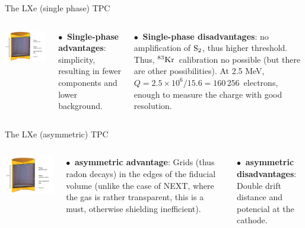\documentclass [aspectratio=169]{beamer}
\newcommand{\KR}{\ensuremath{{}^{83}{\rm Kr}}}
\newcommand{\st}{\ensuremath{\rm S_2}}
\begin{document}
\begin{frame}{The LXe (single phase) TPC}
\begin{columns}
\includegraphics[scale=0.6]{nexosketch.png}

$\bullet~$ {\bf Single-phase advantages}: simplicity, resulting in fewer components and lower background. 

$\bullet~$ {\bf Single-phase disadvantages}: no amplification of \st, thus higher threshold. Thus, \KR\ calibration no possible (but there are other possibilities). At 2.5 MeV, $Q = 2.5\times 10^6/15.6 = 160\, 256$~electrons, enough to measure the charge with good resolution.  
\end{columns}
\end{frame}

\begin{frame}{The LXe (asymmetric) TPC}
\begin{columns}
\includegraphics[scale=0.6]{nexosketch.png}

$\bullet~$ {\bf asymmetric advantage}: Grids (thus radon decays) in the edges of the fiducial volume (unlike the case of NEXT, where the gas is rather transparent, this is a must, otherwise shielding inefficient). 

$\bullet~$ {\bf asymmetric disadvantages}: Double drift distance and potencial at the cathode.  
\end{columns}
\end{frame}
\end{document}

